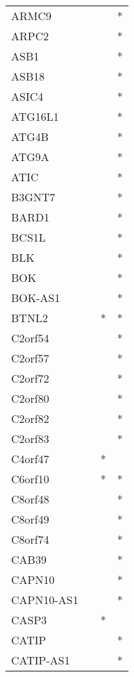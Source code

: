 \begin{longtable}{lccc}
ARMC9          &       &    &       * \\
ARPC2          &       &    &       * \\
ASB1           &       &    &       * \\
ASB18          &       &    &       * \\
ASIC4          &       &    &       * \\
ATG16L1        &       &    &       * \\
ATG4B          &       &    &       * \\
ATG9A          &       &    &       * \\
ATIC           &       &    &       * \\
B3GNT7         &       &    &       * \\
BARD1          &       &    &       * \\
BCS1L          &       &    &       * \\
BLK            &       &    &       * \\
BOK            &       &    &       * \\
BOK-AS1        &       &    &       * \\
BTNL2          &       &  * &       * \\
C2orf54        &       &    &       * \\
C2orf57        &       &    &       * \\
C2orf72        &       &    &       * \\
C2orf80        &       &    &       * \\
C2orf82        &       &    &       * \\
C2orf83        &       &    &       * \\
C4orf47        &       &  * &         \\
C6orf10        &       &  * &       * \\
C8orf48        &       &    &       * \\
C8orf49        &       &    &       * \\
C8orf74        &       &    &       * \\
CAB39          &       &    &       * \\
CAPN10         &       &    &       * \\
CAPN10-AS1     &       &    &       * \\
CASP3          &       &  * &         \\
CATIP          &       &    &       * \\
CATIP-AS1      &       &    &       * \\

\end{longtable}
